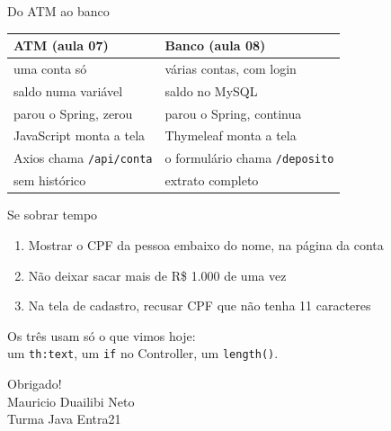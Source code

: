 \documentclass[aspectratio=169,11pt]{beamer}
\begin{document}
\begin{frame}{Do ATM ao banco}
  \begin{center}
  \begin{tabular}{ll}
    \toprule
    ATM (aula 07) & Banco (aula 08) \\
    \midrule
    uma conta só & várias contas, com login \\
    saldo numa variável & saldo no MySQL \\
    parou o Spring, zerou & parou o Spring, continua \\
    JavaScript monta a tela & Thymeleaf monta a tela \\
    Axios chama \texttt{/api/conta} & o formulário chama \texttt{/deposito} \\
    sem histórico & extrato completo \\
    \bottomrule
  \end{tabular}
  \end{center}
\end{frame}

\begin{frame}{Se sobrar tempo}
  \begin{enumerate}
    \item Mostrar o CPF da pessoa embaixo do nome, na página da conta
    \item Não deixar sacar mais de R\$ 1.000 de uma vez
    \item Na tela de cadastro, recusar CPF que não tenha 11 caracteres
  \end{enumerate}

  \vspace{0.6em}
  Os três usam só o que vimos hoje:\\
  um \texttt{th:text}, um \texttt{if} no Controller, um \texttt{length()}.
\end{frame}

\begin{frame}
  \begin{center}
    \Huge Obrigado!\\[1.2em]
    \normalsize Mauricio Duailibi Neto\\
    Turma Java Entra21
  \end{center}
\end{frame}
\end{document}
